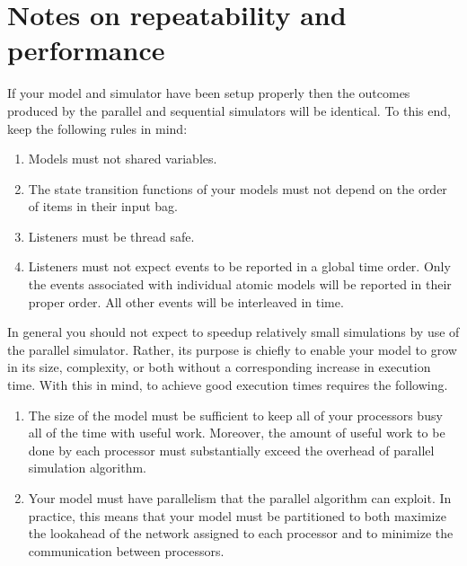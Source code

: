 \section{Notes on repeatability and performance}
If your model and simulator have been setup properly then the outcomes produced by the parallel and sequential simulators will be identical. To this end, keep the following rules in mind:
\begin{enumerate}
\item Models must not shared variables.
\item The state transition functions of your models must not depend on the order of items in their input bag.
\item Listeners must be thread safe.
\item Listeners must not expect events to be reported in a global time order. Only the events associated with individual atomic models will be reported in their proper order. All other events will be interleaved in time.
\end{enumerate}
In general you should not expect to speedup relatively small simulations by use of the parallel simulator. Rather, its purpose is chiefly to enable your model to grow in its size, complexity, or both without a corresponding increase in execution time. With this in mind, to achieve good execution times requires the following.
\begin{enumerate}
\item The size of the model must be sufficient to keep all of your processors busy all of the time with useful work. Moreover, the amount of useful work to be done by each processor must substantially exceed the overhead of parallel simulation algorithm.
\item Your model must have parallelism that the parallel algorithm can exploit. In practice, this means that your model must be partitioned to both maximize the lookahead of the network assigned to each processor and to minimize the communication between processors.
\end{enumerate}

